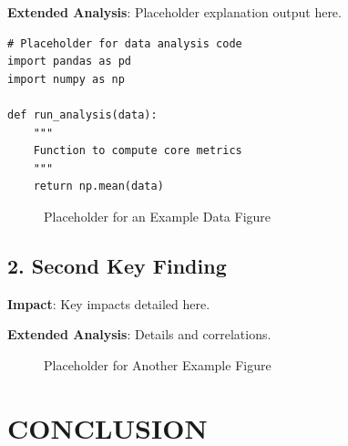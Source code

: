 \documentclass[twocolumn]{article}
\begin{document}
\textbf{Extended Analysis}: Placeholder explanation output here.

\begin{lstlisting}[caption={Example Code Snippet}]
# Placeholder for data analysis code
import pandas as pd
import numpy as np

def run_analysis(data):
    """
    Function to compute core metrics
    """
    return np.mean(data)
\end{lstlisting}

\begin{figure}[H]
    \centering
    \fbox{\rule{0pt}{1.5in} \rule{0.9\linewidth}{0pt}} 
    \caption{Placeholder for an Example Data Figure}
    \label{fig:example_plot}
\end{figure}

\subsection{2. Second Key Finding}
\textbf{Impact}: Key impacts detailed here.

\textbf{Extended Analysis}: Details and correlations.

\begin{figure}[H]
    \centering
    \fbox{\rule{0pt}{1.5in} \rule{0.9\linewidth}{0pt}} 
    \caption{Placeholder for Another Example Figure}
    \label{fig:example_plot2}
\end{figure}

\section{CONCLUSION}
\lipsum[10]

\nocite{*} %
\printbibliography
\end{document}
